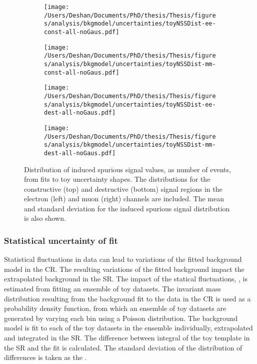 \begin{figure}[h!]
    \centering
    \begin{subfigure}[b]{0.49\textwidth}
        \centering
        \texttt{[image: /Users/Deshan/Documents/PhD/thesis/Thesis/figures/analysis/bkgmodel/uncertainties/toyNSSDist-ee-const-all-noGaus.pdf]}
        \label{fig:bkgmodel:issu1}
    \end{subfigure}
    \begin{subfigure}[b]{0.49\textwidth}
        \centering
        \texttt{[image: /Users/Deshan/Documents/PhD/thesis/Thesis/figures/analysis/bkgmodel/uncertainties/toyNSSDist-mm-const-all-noGaus.pdf]}
        \label{fig:bkgmodel:issu2}
    \end{subfigure}
    \begin{subfigure}[b]{0.49\textwidth}
        \centering
        \texttt{[image: /Users/Deshan/Documents/PhD/thesis/Thesis/figures/analysis/bkgmodel/uncertainties/toyNSSDist-ee-dest-all-noGaus.pdf]}
        \label{fig:bkgmodel:issu3}
    \end{subfigure}
    \begin{subfigure}[b]{0.49\textwidth}
        \centering
        \texttt{[image: /Users/Deshan/Documents/PhD/thesis/Thesis/figures/analysis/bkgmodel/uncertainties/toyNSSDist-mm-dest-all-noGaus.pdf]}
        \label{fig:bkgmodel:issu4}
    \end{subfigure}
    \caption[Induced spurious signal distributions from fits to toy uncertainties.]{Distribution of induced spurious signal values, as number of events, from fits to toy uncertainty shapes. The distributions for the constructive (top) and destructive (bottom) signal regions in the electron (left) and muon (right) channels are included. The mean and standard deviation for the induced spurious signal distribution is also shown.}
    \label{fig:bkgmodel:issu}
\end{figure}

\subsubsection{Statistical uncertainty of fit}\label{sec:extrap:ststu}
Statistical fluctuations in data can lead to variations of the fitted background model in the CR. The resulting variations of the fitted background impact the extrapolated background in the SR. The impact of the statical fluctuations, \STATU, is estimated from fitting an ensemble of toy datasets. The invariant mass distribution resulting from the background fit to the data in the CR is used as a probability density function, from which an ensemble of toy datasets are generated by varying each bin using a Poisson distribution. The background model is fit to each of the toy datasets in the ensemble individually, extrapolated and integrated in the SR. The difference between integral of the toy template in the SR and the fit is calculated. The standard deviation of the distribution of differences is taken as the \STATU. 

